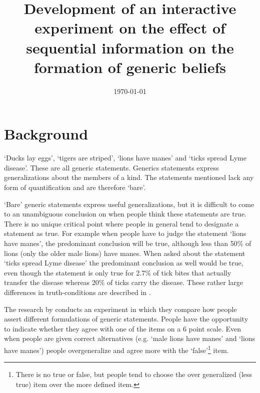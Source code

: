 \documentclass{uva-inf-article}
\title{Development of an interactive experiment on the effect of sequential information on the formation of generic beliefs}
\date{\today}
\begin{document}
\maketitle


\section{Background}
`Ducks lay eggs', `tigers are striped', `lions have manes' and `ticks spread Lyme disease'. These are all generic statements. Generics statements express generalizations about the members of a kind. The statements mentioned lack any form of quantification and are therefore `bare'. 

`Bare' generic statements express useful generalizations, but it is difficult to come to an unambiguous conclusion on when people think these statements are true. There is no unique critical point where people in general tend to designate a statement as true. For example when people have to judge the statement `lions have manes', the predominant conclusion will be true, although less than 50\% of lions (only the older male lions) have manes. When asked about the statement `ticks spread Lyme disease' the predominant conclusion as well would be true, even though the statement is only true for 2.7\% \parencite{rivm_2019} of tick bites that actually transfer the disease whereas 20\% of ticks carry the disease. These rather large differences in truth-conditions are described in \cite{leslie2011all}. 

The research by \cite{leslie2011all} conducts an experiment in which they compare how people assert different formulations of generic statements. People have the opportunity to indicate whether they agree with one of the items on a 6 point scale. Even when people are given correct alternatives (e.g. `male lions have manes' and `lions have manes') people overgeneralize and agree more with the `false'\footnote{There is no true or false, but people tend to choose the over generalized (less true) item over the more defined item.} item.  

\newpage
\end{document}
